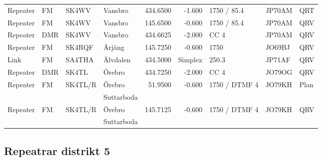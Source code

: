\begin{landscape}
\begin{longtable}{llllrrlll}
Repeater & FM         & SK4WV    & Vansbro             & 434.6500     & -1.600     & 1750 / 85.4   & JP70AM      & QRT      \\
Repeater & FM         & SK4WV    & Vansbro             & 145.6500     & -0.600     & 1750 / 85.4   & JP70AM      & QRV      \\
Repeater & DMR        & SK4WV    & Vansbro             & 434.6625     & -2.000     & CC 4          & JP70AM      & QRV      \\
Repeater & FM         & SK4RQF   & Årjäng              & 145.7250     & -0.600     & 1750          & JO69BJ      & QRV      \\
Link     & FM         & SA4THA   & Älvdalen            & 434.5000     & Simplex    & 250.3         & JP71AF      & QRV      \\
Repeater & DMR        & SK4TL    & Örebro              & 434.7250     & -2.000     & CC 4          & JO79OG      & QRV      \\
Repeater & FM         & SK4TL/R  & Örebro              & 51.9500      & -0.600     & 1750 / DTMF 4 & JO79KH      & Plan     \\
         &            &          & Suttarboda          &              &            &               &             &          \\
Repeater & FM         & SK4TL/R  & Örebro              & 145.7125     & -0.600     & 1750 / DTMF 4 & JO79KH      & QRV      \\
         &            &          & Suttarboda          &              &            &               &             &          \\
\end{longtable}



\clearpage

\subsection{Repeatrar distrikt 5}


\end{landscape}
